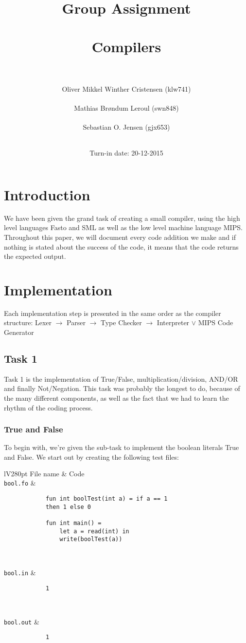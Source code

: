 \documentclass[a4paper]{article}
\title{Group Assignment\\ \ \\Compilers\\ \ \\}
\author{Oliver Mikkel Winther Cristensen (klw741) \\ \ \\Mathias Brøndum Leroul (swn848)\\ \ \\Sebastian O. Jensen (gjx653)\\ \ \\}
\date{Turn-in date: 20-12-2015}
\newcommand{\command}[1]{\texttt{\string#1}}
\begin{document}
\maketitle
\newpage

\tableofcontents
\newpage

\section{Introduction}
	We have been given the grand task of creating a small compiler, using the high level languages Fasto and SML as well as the low level machine language MIPS. Throughout this paper, we will document every code addition we make and if nothing is stated about the success of the code, it means that the code returns the expected output.
	
\section{Implementation}
	Each implementation step is presented in the same order as the compiler structure: Lexer $\rightarrow$ Parser $\rightarrow$ Type Checker $\rightarrow$ Interpreter $\vee$ MIPS Code Generator
\subsection{Task 1}
	Task 1 is the implementation of True/False, multiplication/division, AND/OR and finally Not/Negation. This task was probably the longest to do, because of the many different components, as well as the fact that we had to learn the rhythm of the coding process.
	
\subsubsection{True and False}

	To begin with, we're given the sub-task to implement the boolean literals True and False. We start out by creating the following test files:
	
\begin{center}	
	\begin{tabular}{lV{280pt}}
		\toprule
		File name & Code\\
		\midrule
		\command{bool.fo} &
		\begin{verbatim}
			fun int boolTest(int a) = if a == 1
			then 1 else 0
			
			fun int main() =
			    let a = read(int) in
			    write(boolTest(a))
			  
		\end{verbatim}
		\\
		\command{bool.in} &
		\begin{verbatim}
			1
			
		\end{verbatim}
		\\
		\command{bool.out} &
		\begin{verbatim}
			1
		\end{verbatim}
		\\
		\bottomrule \\
	\end{tabular}
\end{center}
\end{document}
